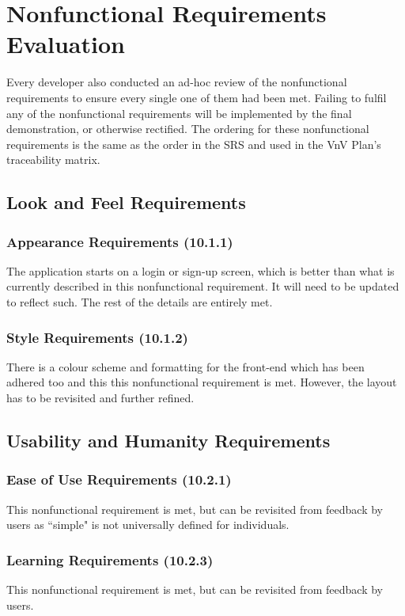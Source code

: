 \documentclass[12pt, titlepage]{article}
\begin{document}
\section{Nonfunctional Requirements Evaluation}
Every developer also conducted an ad-hoc review of the nonfunctional requirements to ensure every single one of them had been met. Failing to fulfil any of the nonfunctional requirements will be implemented by the final demonstration, or otherwise rectified. The ordering for these nonfunctional requirements is the same as the order in the SRS and used in the VnV Plan's traceability matrix.

\subsection{Look and Feel Requirements}
\subsubsection{Appearance Requirements (10.1.1)}
The application starts on a login or sign-up screen, which is better than what is currently described in this nonfunctional requirement. It will need to be updated to reflect such. The rest of the details are entirely met.

\subsubsection{Style Requirements (10.1.2)}
There is a colour scheme and formatting for the front-end which has been adhered too and this this nonfunctional requirement is met. However, the layout has to be revisited and further refined.

\subsection{Usability and Humanity Requirements}
\subsubsection{Ease of Use Requirements (10.2.1)}
This nonfunctional requirement is met, but can be revisited from feedback by users as ``simple" is not universally defined for individuals.

\subsubsection{Learning Requirements (10.2.3)}
This nonfunctional requirement is met, but can be revisited from feedback by users.
\end{document}
